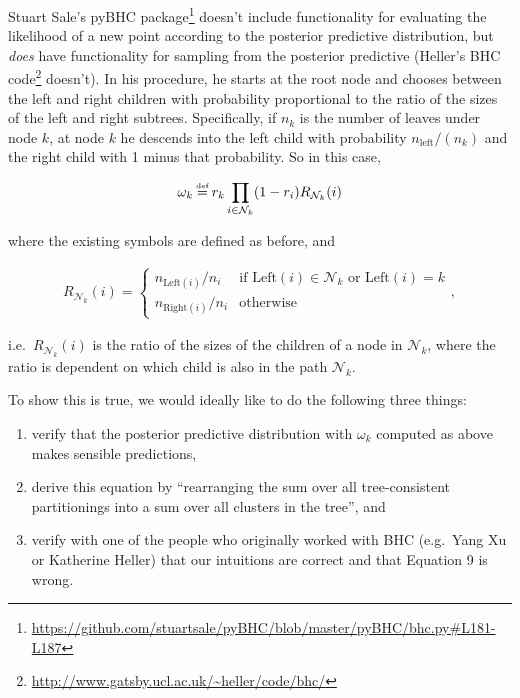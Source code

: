 \documentclass[letterpaper]{article}
\newcommand\defeq{\stackrel{\mathclap{\normalfont\mbox{\tiny def}}}{=}}
\begin{document}
Stuart Sale's pyBHC
package\footnote{\url{https://github.com/stuartsale/pyBHC/blob/master/pyBHC/bhc.py#L181-L187}}
doesn't include functionality for evaluating the likelihood of a new point according to the
posterior predictive distribution, but \emph{does} have functionality for sampling from the
posterior predictive (Heller's BHC
code\footnote{\url{http://www.gatsby.ucl.ac.uk/~heller/code/bhc/}}
doesn't). In his procedure, he starts at the root node and chooses between the left and right
children with probability proportional to the ratio of the sizes of the left and right subtrees.
Specifically, if $n_k$ is the number of leaves under node $k$, at node $k$ he descends into the
left child with probability $n_{\text{left}} / (n_k)$ and the right
child with 1 minus that probability. So in this case,

$$
\omega_k \defeq r_k \prod_{i \in \mathcal{N}_k} (1 - r_i) R_{\mathcal{N}_k}(i)
$$

where the existing symbols are defined as before, and

\begin{align*}
  R_{\mathcal{N}_k}(i) = \begin{cases}
  n_{\text{Left}(i)} / n_i  & \text{if $\text{Left}(i) \in \mathcal{N}_k$ or $\text{Left}(i) = k$} \\
  n_{\text{Right}(i)} / n_i & \text{otherwise}
  \end{cases},
\end{align*}


i.e.\ $R_{\mathcal{N}_k}(i)$ is the ratio of the sizes of the children of a node in
$\mathcal{N}_k$, where the ratio is dependent on which child is also in the path $\mathcal{N}_k$.

To show this is true, we would ideally like to do the following three things:

\begin{enumerate}
  \item verify that the posterior predictive distribution with $\omega_k$ computed as above makes sensible
    predictions,
  \item derive this equation by ``rearranging the sum over all tree-consistent
    partitionings into a sum over all clusters in the tree'', and
  \item verify with one of the people who originally worked with BHC (e.g.\ Yang Xu or Katherine
    Heller) that our intuitions are correct and that Equation 9 is wrong.
\end{enumerate}
\end{document}
